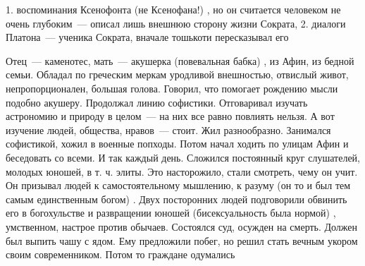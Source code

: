 	1. воспоминания Ксенофонта (не Ксенофана!) , но он считается человеком не очень глубоким~--- описал лишь внешнюю сторону жизни Сократа, 
	2. диалоги Платона~--- ученика Сократа, вначале тошькоти пересказывал его

Отец~--- каменотес, мать~--- акушерка (повевальная бабка) , из Афин, из бедной семьи. Обладал по греческим меркам уродливой внешностью, отвислый живот, непропорционален, большая голова. 
Говорил, что помогает рождению мысли подобно акушеру. Продолжал линию софистики. Отговаривал изучать астрономию и природу в целом~--- на них все равно повлиять нельзя. А вот изучение людей, общества, нравов~--- стоит. 
Жил разнообразно. Занимался софистикой, хожил в военные попходы. Потом начал ходить по улицам Афин и беседовать со всеми. И так каждый день. 
Сложился постоянный круг слушателей, молодых юношей, в т. ч. элиты. Это насторожило, стали смотреть, чему он учит. 
Он призывал людей к самостоятельному мышлению, к разуму (он то и был тем самым единственным богом) . 
Двух посторонних людей подговорили обвинить его в богохульстве и развращении юношей (бисексуальность была нормой) , умственном, настрое против обычаев. 
Состоялся суд, осужден на смерть. Должен был выпить чашу с ядом. Ему предложили побег, но решил стать вечным укором своим современником. Потом то граждане одумались
